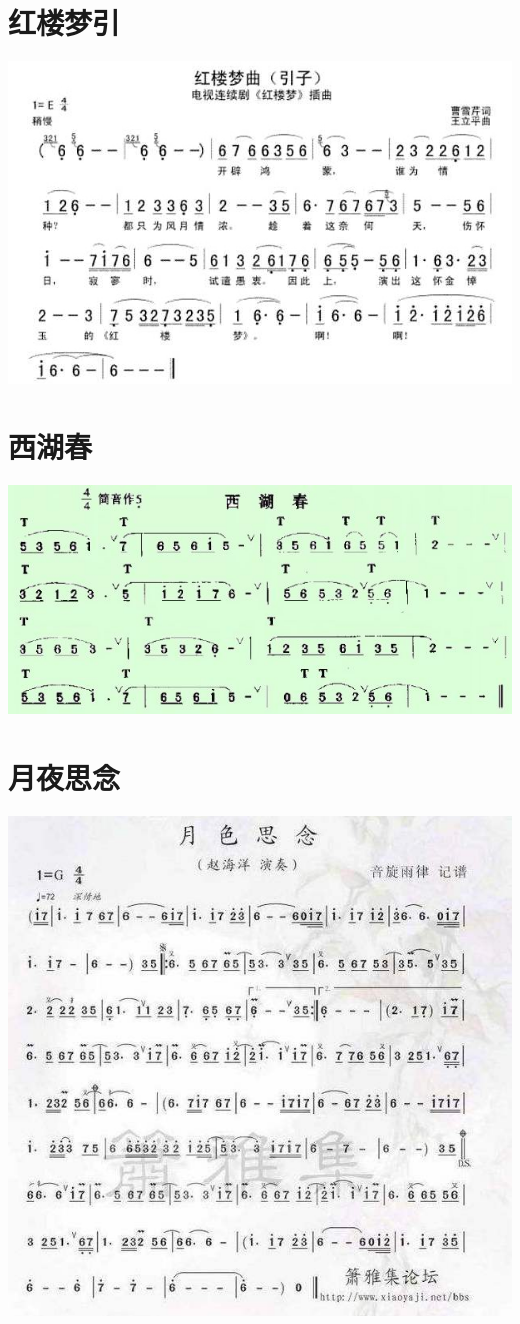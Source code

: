 \documentclass[cn,pad,chinese,chinesefont=nofont]{elegantbook}
\begin{document}
\section{红楼梦引}
    \includegraphics[width=\textwidth]{dongxiao/红楼梦引.jpg}
\section{西湖春}
    \includegraphics[width=\textwidth]{dongxiao/西湖春.jpg}

    
\section{月夜思念}
    \includegraphics[width=\textwidth]{dongxiao/月夜思念.jpg}
\end{document}
